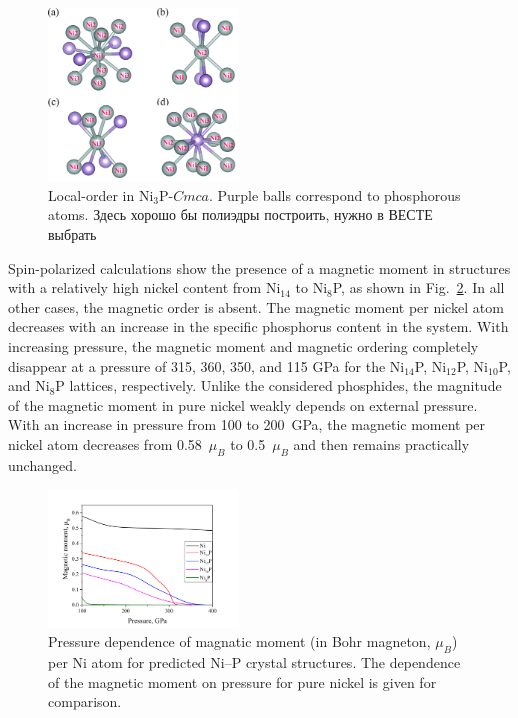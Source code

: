 \documentclass[twoside,twocolumn,9pt]{article}
\begin{document}
\begin{figure}[h]
 \centering
 \includegraphics[width=0.45\textwidth]{Ni3P-local-order.jpg} %
 \caption{Local-order in Ni$_3$P-$Cmca$. Purple balls correspond to phosphorous atoms. {\color{red}Здесь хорошо бы полиэдры построить, нужно в ВЕСТЕ выбрать}}
 \label{Ni3P:local}
\end{figure}

Spin-polarized calculations show the presence of a magnetic moment in structures with a relatively high nickel content from Ni$_{14}$ to Ni$_8$P, as shown in Fig.~\ref{fgr:magmom}. 
In all other cases, the magnetic order is absent. The magnetic moment per nickel atom decreases with an increase in the specific phosphorus content in the system. 
With increasing pressure, the magnetic moment and magnetic ordering completely disappear at a pressure of 315, 360, 350, and 115 GPa for the Ni$_{14}$P, Ni$_{12}$P, Ni$_{10}$P, and Ni$_8$P lattices, respectively. 
Unlike the considered phosphides, the magnitude of the magnetic moment in pure nickel weakly depends on external pressure. 
With an increase in pressure from 100 to 200~GPa, the magnetic moment per nickel atom decreases from 0.58~$\mu_B$ to 0.5~$\mu_B$ and then remains practically unchanged.

\begin{figure}[h]
\centering
  \includegraphics[width=0.45\textwidth]{magmom-uspex.jpg}
  \caption{Pressure dependence of magnatic moment (in Bohr magneton, $\mu_B$) per Ni atom for predicted Ni--P crystal structures.
  The dependence of the magnetic moment on pressure for pure nickel is given for comparison.
  }
  \label{fgr:magmom}
\end{figure}
\end{document}
